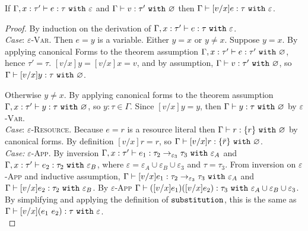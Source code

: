 \documentclass[a4paper,UKenglish]{lipics-v2016}
\begin{document}
\hrulefill


\begin{lemma}
If $\Gamma, x: \tau' \vdash e: \tau~\mathtt{with}~ \varepsilon$ and $\Gamma \vdash v: \tau'~\mathtt{with}~ \varnothing$ then $\Gamma \vdash [v/x]e: \tau~\mathtt{with}~ \varepsilon$.
\end{lemma}


\begin{proof} By induction on the derivation of $ \Gamma, x:  \tau' \vdash e:  \tau~\mathtt{with}~ \varepsilon$. \\

\textit{Case}: \textsc{$\varepsilon$-Var}. Then $ e = y$ is a variable. Either $y = x$ or $y \neq x$. Suppose $y=x$. By applying canonical Forms to the theorem assumption $\Gamma, x: \tau' \vdash e: \tau'~\mathtt{with}~ \varnothing$, hence $\tau' = \tau$. $[v/x]y = [v/x]x = v$, and by assumption, $\Gamma \vdash v: \tau'~\mathtt{with}~ \varnothing$, so $\Gamma \vdash [v/x]y: \tau~\mathtt{with}~ \varnothing$.

Otherwise $y \neq x$. By applying canonical forms to the theorem assumption $\Gamma, x: \tau' \vdash y: \tau~\mathtt{with}~ \varnothing$, so $y: \tau \in \Gamma$. Since $[v/x]y = y$, then $\Gamma \vdash y: \tau~\mathtt{with}~ \varnothing$ by \textsc{$\varepsilon$-Var}. \\

\textit{Case}: \textsc{$\varepsilon$-Resource}. Because $ e = r$ is a resource literal then $ \Gamma \vdash r:  \{ r \}~\mathtt{with}~ \varnothing$ by canonical forms. By definition $[ v/x]r = r$, so $ \Gamma \vdash [ v/x]r:  \{ \bar r\}~\mathtt{with}~ \varnothing$. \\

\textit{Case:} \textsc{$\varepsilon$-App}. By inversion $ \Gamma, x:  \tau' \vdash  e_1: \tau_2 \rightarrow_{\varepsilon_3}  \tau_3~\mathtt{with}~ \varepsilon_A$ and $ \Gamma, x:  \tau' \vdash  e_2:  \tau_2~\mathtt{with}~ \varepsilon_B$, where $\varepsilon = \varepsilon_A \cup \varepsilon_B \cup \varepsilon_3$ and $ \tau =  \tau_3$. From inversion on \textsc{$\varepsilon$-App} and inductive assumption, $ \Gamma \vdash [ v/x] e_1:  \tau_2 \rightarrow_{\varepsilon_3}  \tau_3~\mathtt{with}~ \varepsilon_A$ and $ \Gamma \vdash [ v/x] e_2:  \tau_2~\mathtt{with}~ \varepsilon_B$. By \textsc{$\varepsilon$-App}  $ \Gamma \vdash ([ v/x] e_1) ([ v/x] e_2) :  \tau_3~\mathtt{with}~ \varepsilon_A \cup \varepsilon_B \cup \varepsilon_3$. By simplifying and applying the definition of $\mathtt{substitution}$, this is the same as $ \Gamma \vdash [ v/x]( e_1~ e_2):  \tau~\mathtt{with}~ \varepsilon$. \\


\end{proof}
\end{document}
